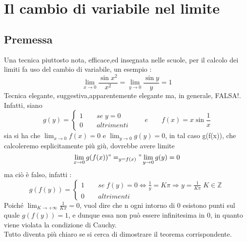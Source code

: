 \documentclass[fontsize = 20px, paper = a4]{article}
\begin{document}
\section{Il cambio di variabile nel limite}
\subsection{Premessa}
Una tecnica piuttosto nota, efficace,ed insegnata nelle scuole, per il calcolo dei limiti fa uso del cambio di variabile, un esempio :
$$\lim_{x \to 0} \frac{\sin x^2}{x^2} = \lim_{y \to 0}\frac{\sin y}{y} = 1$$
Tecnica elegante, suggestiva,apparentemente elegante ma, in generale, FALSA!. Infatti, siano
\[g(y) = \left\{
  \begin{array}{lr}
    1 \qquad se \; y = 0  \\
   0  \qquad altrimenti 
  \end{array}
\right.
\qquad e \qquad f(x) = x\sin \frac{1}{x}
\]
sia si ha che $\lim_{x \to 0}f(x) = 0$ e $\lim_{y \to 0}g(y) = 0$, in tal caso g(f(x)), che calcoleremo esplicitamente più giù, dovrebbe avere limite 
$$\lim_{x \to 0}g(f(x)) "=_{y = f(x)}" \lim_{y \to 0}g(y) = 0$$
ma ciò è falso, infatti : 
\[g(f(y)) = \left\{
  \begin{array}{lr}
    1 \qquad se \; f(y) = 0 \Leftrightarrow \frac{1}{y} = K\pi \Rightarrow y = \frac{1}{K\pi} \; K \in \mathbb{Z} \\
   0  \qquad altrimenti 
  \end{array}
\right.
\]
Poiché $\lim_{K \to +\infty}\frac{1}{K\pi} = 0$, vuol dire che n ogni intorno di 0 esistono punti sul quale $g(f(y)) = 1$, e dunque essa non può essere infinitesima in 0, in quanto viene violata la condizione di Cauchy. \\
Tutto diventa più chiaro se si cerca di dimostrare il teorema corrispondente.
\end{document}
